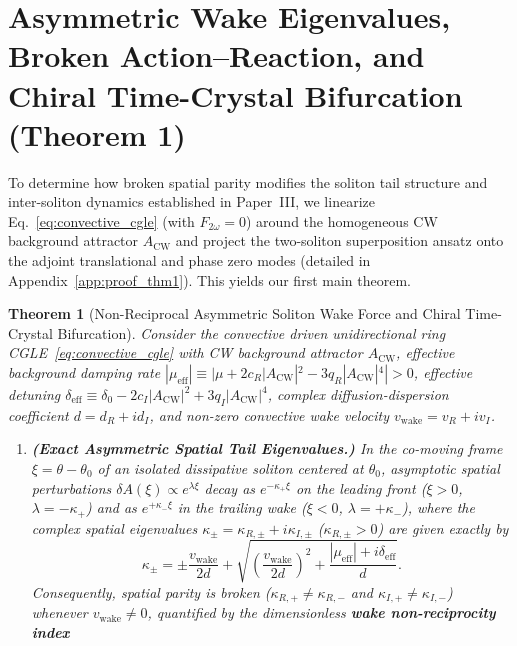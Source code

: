 \documentclass[11pt,letterpaper]{article}
\newtheorem{theorem}{Theorem}
\begin{document}
\section{Asymmetric Wake Eigenvalues, Broken Action--Reaction, and Chiral Time-Crystal Bifurcation (Theorem 1)}
\label{sec:theorem1}

To determine how broken spatial parity modifies the soliton tail structure and inter-soliton dynamics established in Paper~III, we linearize Eq.~\eqref{eq:convective_cgle} (with $F_{2\omega} = 0$) around the homogeneous CW background attractor $A_{\mathrm{CW}}$ and project the two-soliton superposition ansatz onto the adjoint translational and phase zero modes (detailed in Appendix~\ref{app:proof_thm1}). This yields our first main theorem.

\begin{theorem}[Non-Reciprocal Asymmetric Soliton Wake Force and Chiral Time-Crystal Bifurcation]
\label{thm:chiral_tc}
Consider the convective driven unidirectional ring CGLE~\eqref{eq:convective_cgle} with CW background attractor $A_{\mathrm{CW}}$, effective background damping rate $|\mu_{\mathrm{eff}}| \equiv |\mu + 2c_R|A_{\mathrm{CW}}|^2 - 3q_R|A_{\mathrm{CW}}|^4| > 0$, effective detuning $\delta_{\mathrm{eff}} \equiv \delta_0 - 2c_I|A_{\mathrm{CW}}|^2 + 3q_I|A_{\mathrm{CW}}|^4$, complex diffusion-dispersion coefficient $d = d_R + i d_I$, and non-zero convective wake velocity $v_{\mathrm{wake}} = v_R + i v_I$.
\begin{enumerate}
    \item[(a)] \textbf{(Exact Asymmetric Spatial Tail Eigenvalues.)} In the co-moving frame $\xi = \theta - \theta_0$ of an isolated dissipative soliton centered at $\theta_0$, asymptotic spatial perturbations $\delta A(\xi) \propto e^{\lambda\xi}$ decay as $e^{-\kappa_+ \xi}$ on the leading front ($\xi > 0$, $\lambda = -\kappa_+$) and as $e^{+\kappa_- \xi}$ in the trailing wake ($\xi < 0$, $\lambda = +\kappa_-$), where the complex spatial eigenvalues $\kappa_\pm = \kappa_{R,\pm} + i\kappa_{I,\pm}$ ($\kappa_{R,\pm} > 0$) are given exactly by
    \begin{equation}
    \kappa_\pm = \pm\frac{v_{\mathrm{wake}}}{2d} + \sqrt{\left(\frac{v_{\mathrm{wake}}}{2d}\right)^2 + \frac{|\mu_{\mathrm{eff}}| + i\delta_{\mathrm{eff}}}{d}}.
    \label{eq:thm1_kappa_pm}
    \end{equation}
    Consequently, spatial parity is broken ($\kappa_{R,+} \neq \kappa_{R,-}$ and $\kappa_{I,+} \neq \kappa_{I,-}$) whenever $v_{\mathrm{wake}} \neq 0$, quantified by the dimensionless \textbf{wake non-reciprocity index}

\end{enumerate}
\end{theorem}
\end{document}
